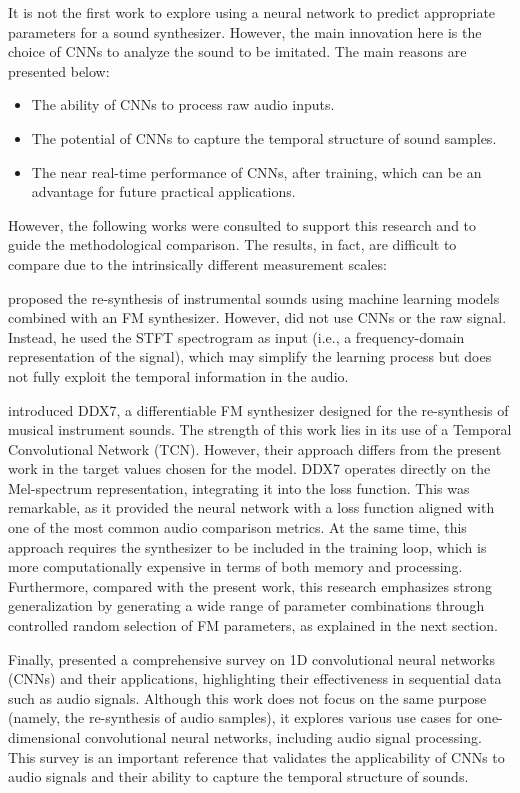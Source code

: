 \documentclass[10pt,conference]{IEEEtran}
\begin{document}
It is not the first work to explore using a neural network to predict appropriate parameters for a sound synthesizer. However, the main innovation here is the choice of CNNs to analyze the sound to be imitated. The main reasons are presented below:

\begin{itemize}
\item The ability of CNNs to process raw audio inputs.
\item The potential of CNNs to capture the temporal structure of sound samples.
\item The near real-time performance of CNNs, after training, which can be an advantage for future practical applications.
\end{itemize}

However, the following works were consulted to support this research and to guide the methodological comparison. The results, in fact, are difficult to compare due to the intrinsically different measurement scales:

\cite{claesson2021resynthesis} proposed the re-synthesis of instrumental sounds using machine learning models combined with an FM synthesizer. However, \cite{claesson2021resynthesis} did not use CNNs or the raw signal. Instead, he used the STFT spectrogram as input (i.e., a frequency-domain representation of the signal), which may simplify the learning process but does not fully exploit the temporal information in the audio.

\cite{steinmetz2022ddx7} introduced DDX7, a differentiable FM synthesizer designed for the re-synthesis of musical instrument sounds. The strength of this work lies in its use of a Temporal Convolutional Network (TCN). However, their approach differs from the present work in the target values chosen for the model. DDX7 operates directly on the Mel-spectrum representation, integrating it into the loss function. This was remarkable, as it provided the neural network with a loss function aligned with one of the most common audio comparison metrics. At the same time, this approach requires the synthesizer to be included in the training loop, which is more computationally expensive in terms of both memory and processing. Furthermore, compared with the present work, this research emphasizes strong generalization by generating a wide range of parameter combinations through controlled random selection of FM parameters, as explained in the next section.

Finally, \cite{kiranyaz2021survey} presented a comprehensive survey on 1D convolutional neural networks (CNNs) and their applications, highlighting their effectiveness in sequential data such as audio signals. Although this work does not focus on the same purpose (namely, the re-synthesis of audio samples), it explores various use cases for one-dimensional convolutional neural networks, including audio signal processing. This survey is an important reference that validates the applicability of CNNs to audio signals and their ability to capture the temporal structure of sounds.
\end{document}
